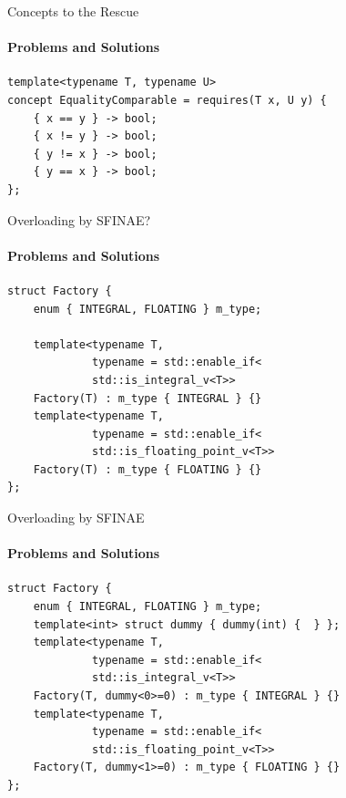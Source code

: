 \documentclass{beamer}
\let\svthefootnote\thefootnote
\newcommand\blankfootnote[1]{%
  \let\thefootnote\relax\footnotetext{#1}%
  \let\thefootnote\svthefootnote%
}
\let\svfootnote\footnote
\renewcommand\footnote[2][?]{%
  \if\relax#1\relax%
    \blankfootnote{#2}%
  \else%
    \if?#1\svfootnote{#2}\else\svfootnote[#1]{#2}\fi%
  \fi
}
\renewcommand*{\thefootnote}{\fnsymbol{footnote}}
\begin{document}
    \begin{frame}[fragile]{Concepts to the Rescue}
        \framesubtitle{Problems and Solutions}
        \begin{center}
        \begin{lstlisting}[caption={\texttt{EqualityComparable} concept which ``satisfies''\footnote{not really; see the Ranges TS, this is \texttt{WeaklyEqualityComparable} \texttt{:)}} Table 1.}]
template<typename T, typename U>
concept EqualityComparable = requires(T x, U y) {
    { x == y } -> bool;
    { x != y } -> bool;
    { y != x } -> bool;
    { y == x } -> bool;
}; \end{lstlisting}
        \end{center}
    \end{frame}

    \begin{frame}[fragile]{Overloading by SFINAE?}
        \framesubtitle{Problems and Solutions}
        \begin{center}
        \begin{lstlisting}[caption={overloading the constructor by using SFINAE \& type traits...}]
struct Factory {
    enum { INTEGRAL, FLOATING } m_type;

    template<typename T,
             typename = std::enable_if<
             std::is_integral_v<T>>
    Factory(T) : m_type { INTEGRAL } {}
    template<typename T,
             typename = std::enable_if<
             std::is_floating_point_v<T>>
    Factory(T) : m_type { FLOATING } {}
}; \end{lstlisting}
        \end{center}
    \end{frame}

    \begin{frame}[fragile]{Overloading by SFINAE}
        \framesubtitle{Problems and Solutions}
        \begin{center}
        \begin{lstlisting}[caption={...doesn't work if we don't use a \texttt{dummy} for disambiguation.}]
struct Factory {
    enum { INTEGRAL, FLOATING } m_type;
    template<int> struct dummy { dummy(int) {  } };
    template<typename T,
             typename = std::enable_if<
             std::is_integral_v<T>>
    Factory(T, dummy<0>=0) : m_type { INTEGRAL } {}
    template<typename T,
             typename = std::enable_if<
             std::is_floating_point_v<T>>
    Factory(T, dummy<1>=0) : m_type { FLOATING } {}
}; \end{lstlisting}
        \end{center}
    \end{frame}
\end{document}
